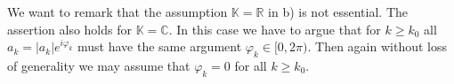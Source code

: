 We want to remark that the assumption $\mathbb{K}=\mathbb{R}$ in b) is not essential. The assertion also holds for $\mathbb{K}=\mathbb{C}$. In this case we have 
to argue that for $k\geq k_0$ all $a_k = |a_k|e^{i\varphi_k}$ must have the same argument $\varphi_k\in [0,2\pi)$. Then again without loss
of generality we may assume that $\varphi_k = 0$ for all $k\geq k_0$.

